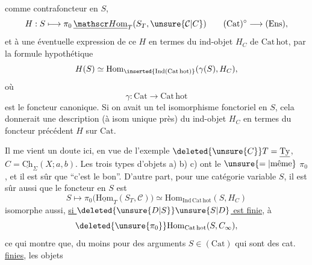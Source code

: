 
comme contrafoncteur en $S$,
\[
H:S\longmapsto\pi_0\,\underline{\mathscr H\mathrm{om}}_T(S_T,\unsure{\mathcal C|C})\qquad(\mathrm{Cat})^\circ\longrightarrow(\mathrm{Ens}),
\]
et à une éventuelle expression de ce  $H$ en termes du ind-objet $H_C$ de $\mathrm{Cat\,hot}$, par la formule hypothétique
\[
H(S)\simeq\mathrm{Hom}_{\inserted{\mathrm{Ind}(\mathrm{Cat\,hot})}}(\gamma(S),H_C),
\]
où
\[
\gamma:\mathrm{Cat}\longrightarrow\mathrm{Cat\,hot}
\]
est le foncteur canonique. Si on avait un tel isomorphisme  fonctoriel en $S$, cela donnerait une description (à isom unique près) du ind-objet $H_C$ en termes du foncteur précédent $H$ sur $\mathrm{Cat}$. 

Il me vient un doute ici, en vue de l'exemple $\deleted{\unsure{C}}T=\underline{\mathrm{Ty}}$, $C=\underline{\mathrm{Ch}}_\Sigma(X;a,b)$. Les trois types d'objets a) b) c) ont le $\unsure{=|\text{même}}$ $\pi_0$, et il est sûr que ``c'est le bon''. D'autre part, pour une catégorie  variable $S$, il est sûr aussi que le  foncteur en $S$ est
\[
S\longmapsto\pi_0\bigl(\underline{\mathrm{Hom}}_T(S_T,\mathcal C)\bigr)\simeq\mathrm{Hom}_{\mathrm{Ind\,Cat\,hot}}(S,H_C)
\]
isomorphe aussi, \uline{si $\deleted{\unsure{D|S}}\unsure{S|D}$ est finie}, à
\[
\deleted{\unsure{\pi_0}}\mathrm{Hom}_{\mathrm{Cat\,hot}}(S,C_\infty),
\]
ce qui montre que, du moins pour des arguments $S\in(\mathrm{Cat})$ qui sont des cat. \uline{finies}, les objets


